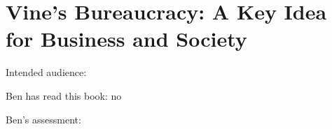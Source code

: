 \section{Vine's Bureaucracy: A Key Idea for Business and Society\label{review:vine_key}}

\cite{2020_Vine}

Intended audience:

Ben has read this book: no

Ben's assessment: 
